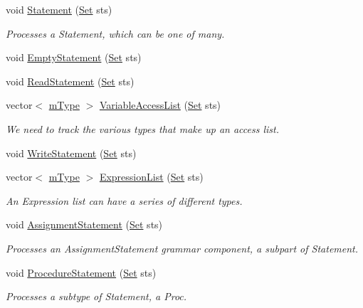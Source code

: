 \begin{DoxyCompactItemize}
void \hyperlink{classParser_a23d5c23531d92c7249034a9e637b4467}{Statement} (\hyperlink{classSet}{Set} sts)
\begin{DoxyCompactList}\small\item\em Processes a Statement, which can be one of many. \item\end{DoxyCompactList}\item 
void \hyperlink{classParser_aa5c2ec1d4c045a6783887bd7453e99ed}{EmptyStatement} (\hyperlink{classSet}{Set} sts)
\item 
void \hyperlink{classParser_ac356b40bf99f68cc721b7e4ad2ebb67d}{ReadStatement} (\hyperlink{classSet}{Set} sts)
\item 
vector$<$ \hyperlink{blocktable_8h_a636cfca014f3212ea82d45e28f9cb51b}{mType} $>$ \hyperlink{classParser_a83bdac30bb8bb5d9ee0c820b4d670179}{VariableAccessList} (\hyperlink{classSet}{Set} sts)
\begin{DoxyCompactList}\small\item\em We need to track the various types that make up an access list. \item\end{DoxyCompactList}\item 
void \hyperlink{classParser_a092a51a38e65c3be07328bfc1e370f0e}{WriteStatement} (\hyperlink{classSet}{Set} sts)
\item 
vector$<$ \hyperlink{blocktable_8h_a636cfca014f3212ea82d45e28f9cb51b}{mType} $>$ \hyperlink{classParser_a5b5064d9a2c559fb1aae1c39d5fe3663}{ExpressionList} (\hyperlink{classSet}{Set} sts)
\begin{DoxyCompactList}\small\item\em An Expression list can have a series of different types. \item\end{DoxyCompactList}\item 
void \hyperlink{classParser_a472a0dc9ed06ffc3ec260992ae7197ca}{AssignmentStatement} (\hyperlink{classSet}{Set} sts)
\begin{DoxyCompactList}\small\item\em Processes an AssignmentStatement grammar component, a subpart of Statement. \item\end{DoxyCompactList}\item 
void \hyperlink{classParser_a7a6c6b63d49340ff06c453ce8954eeff}{ProcedureStatement} (\hyperlink{classSet}{Set} sts)
\begin{DoxyCompactList}\small\item\em Processes a subtype of Statement, a Proc. \item\end{DoxyCompactList}\item 

\end{DoxyCompactItemize}
